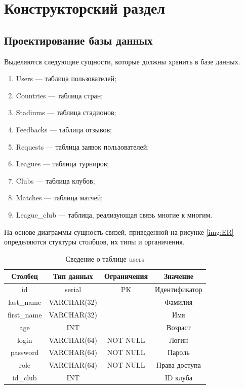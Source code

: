 \section{Конструкторский раздел}
\subsection{Проектирование базы данных}

Выделяются следующие сущности, которые должны хранить в базе данных.

\begin{enumerate}
	\item Users --- таблица пользователей;
	\item Countries --- таблица стран;
	\item Stadiums --- таблица стадионов;
	\item Feedbacks --- таблица отзывов;
	\item Requests --- таблица заявок пользователей;
	\item Leagues --- таблица турниров;
	\item Clubs --- таблица клубов;
	\item Matches --- таблица матчей;
	\item League\_club --- таблица, реализующая связь многие к многим.
\end{enumerate}

На основе диаграммы сущность-связей, приведенной на рисунке \ref{img:ER} определяются стуктуры столбцов, их типы и органичения.

\begin{table}[H]
	\begin{center}
		\caption{Сведение о таблице users}
		\begin{tabular}{|c|c|c|c|}
			\hline
			Столбец & Тип данных & Ограничения & Значение \\
			\hline
			id & serial & PK & Идентификатор \\
			\hline
			last\_name & VARCHAR(32) & & Фамилия \\
			\hline
			first\_name & VARCHAR(32) & & Имя\\
			\hline
			age & INT &  & Возраст\\
			\hline
			login & VARCHAR(64) & NOT NULL &  Логин \\
			\hline
			password & VARCHAR(64) & NOT NULL & Пароль \\
			\hline
			role & VARCHAR(64) & NOT NULL & Права доступа \\
			\hline
			id\_club & INT &  & ID клуба \\
			\hline			
		\end{tabular}
		\label{table:db:users}
	\end{center}
\end{table}

